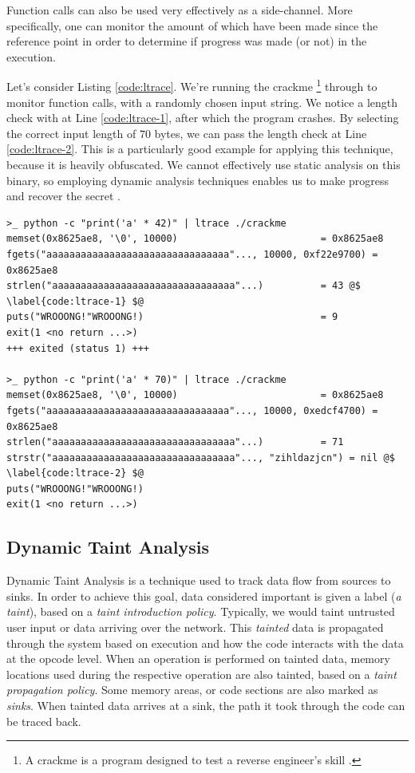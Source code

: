 Function calls can also be used very effectively as a side-channel. More specifically, one can monitor the amount of  which have been made since the reference point in order to determine if progress was made (or not) in the execution. 

Let's consider Listing \ref{code:ltrace}. We're running the crackme \footnote{A crackme is a program designed to test a reverse engineer's skill \cite{crackme}.} through  to monitor function calls, with a randomly chosen input string. We notice a length check with  at Line \ref{code:ltrace-1}, after which the program crashes. By selecting the correct input length of $70$ bytes, we can pass the length check at Line \ref{code:ltrace-2}. This  is a particularly good example for applying this technique, because it is heavily obfuscated. We cannot effectively use static analysis on this binary, so employing dynamic analysis techniques enables us to make progress and recover the secret \cite{crusu_relabs}.

\begin{lstlisting}[caption={ltrace (``a library call tracer'') output of an obfuscated crackme. One can observe a length check in the first execution, and different output when an input of the expected length is provided.}, label={code:ltrace}]
>_ python -c "print('a' * 42)" | ltrace ./crackme
memset(0x8625ae8, '\0', 10000)                         = 0x8625ae8
fgets("aaaaaaaaaaaaaaaaaaaaaaaaaaaaaaaa"..., 10000, 0xf22e9700) = 0x8625ae8
strlen("aaaaaaaaaaaaaaaaaaaaaaaaaaaaaaaa"...)          = 43 @$ \label{code:ltrace-1} $@
puts("WROOONG!"WROOONG!)                               = 9
exit(1 <no return ...>)
+++ exited (status 1) +++

>_ python -c "print('a' * 70)" | ltrace ./crackme
memset(0x8625ae8, '\0', 10000)                         = 0x8625ae8
fgets("aaaaaaaaaaaaaaaaaaaaaaaaaaaaaaaa"..., 10000, 0xedcf4700) = 0x8625ae8
strlen("aaaaaaaaaaaaaaaaaaaaaaaaaaaaaaaa"...)          = 71
strstr("aaaaaaaaaaaaaaaaaaaaaaaaaaaaaaaa"..., "zihldazjcn") = nil @$ \label{code:ltrace-2} $@
puts("WROOONG!"WROOONG!)
exit(1 <no return ...>)
\end{lstlisting}

\subsection{Dynamic Taint Analysis}

Dynamic Taint Analysis is a technique used to track data flow from sources to sinks. In order to achieve this goal, data considered important is given a label (\emph{a taint}), based on a \emph{taint introduction policy}. Typically, we would taint untrusted user input or data arriving over the network. This \emph{tainted} data is propagated through the system based on execution and how the code interacts with the data at the opcode level. When an operation is performed on tainted data, memory locations used during the respective operation are also tainted, based on a \emph{taint propagation policy}. Some memory areas, or code sections are also marked as \emph{sinks}. When tainted data arrives at a sink, the path it took through the code can be traced back. 

